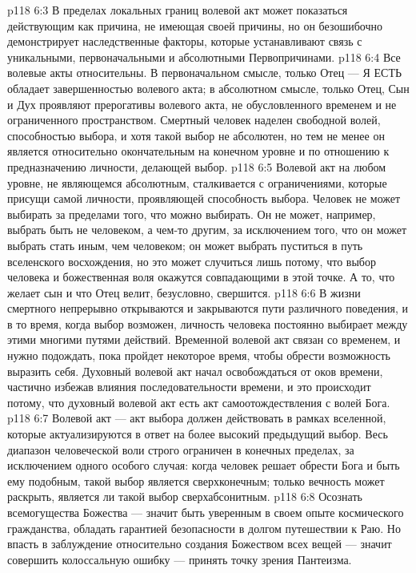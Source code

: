 \vs p118 6:3 \pc В пределах локальных границ волевой акт может показаться действующим как причина, не имеющая своей причины, но он безошибочно демонстрирует наследственные факторы, которые устанавливают связь с уникальными, первоначальными и абсолютными Первопричинами.
\vs p118 6:4 Все волевые акты относительны. В первоначальном смысле, только Отец --- Я ЕСТЬ обладает завершенностью волевого акта; в абсолютном смысле, только Отец, Сын и Дух проявляют прерогативы волевого акта, не обусловленного временем и не ограниченного пространством. Смертный человек наделен свободной волей, способностью выбора, и хотя такой выбор не абсолютен, но тем не менее он является относительно окончательным на конечном уровне и по отношению к предназначению личности, делающей выбор.
\vs p118 6:5 Волевой акт на любом уровне, не являющемся абсолютным, сталкивается с ограничениями, которые присущи самой личности, проявляющей способность выбора. Человек не может выбирать за пределами того, что можно выбирать. Он не может, например, выбрать быть не человеком, а чем\hyp{}то другим, за исключением того, что он может выбрать стать иным, чем человеком; он может выбрать пуститься в путь вселенского восхождения, но это может случиться лишь потому, что выбор человека и божественная воля окажутся совпадающими в этой точке. А то, что желает сын и что Отец велит, безусловно, свершится.
\vs p118 6:6 В жизни смертного непрерывно открываются и закрываются пути различного поведения, и в то время, когда выбор возможен, личность человека постоянно выбирает между этими многими путями действий. Временной волевой акт связан со временем, и нужно подождать, пока пройдет некоторое время, чтобы обрести возможность выразить себя. Духовный волевой акт начал освобождаться от оков времени, частично избежав влияния последовательности времени, и это происходит потому, что духовный волевой акт есть акт самоотождествления с волей Бога.
\vs p118 6:7 Волевой акт --- акт выбора должен действовать в рамках вселенной, которые актуализируются в ответ на более высокий предыдущий выбор. Весь диапазон человеческой воли строго ограничен в конечных пределах, за исключением одного особого случая: когда человек решает обрести Бога и быть ему подобным, такой выбор является сверхконечным; только вечность может раскрыть, является ли такой выбор сверхабсонитным.
\vs p118 6:8 \pc Осознать всемогущества Божества --- значит быть уверенным в своем опыте космического гражданства, обладать гарантией безопасности в долгом путешествии к Раю. Но впасть в заблуждение относительно создания Божеством всех вещей --- значит совершить колоссальную ошибку --- принять точку зрения Пантеизма.
